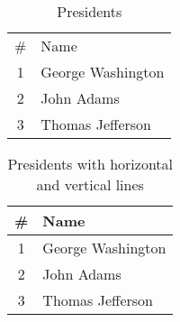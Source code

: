 
\begin{table}
    \caption{Presidents}
    \begin{center}
        \begin{tabular}{cl}
            \#& Name\\
            1&  George Washington\\
            2&  John Adams\\
            3&  Thomas Jefferson\\
        \end{tabular}
    \end{center}
\end{table}

\begin{table}
    \caption{Presidents with horizontal and vertical lines}
    \begin{center}
        \begin{tabular}{|c|l|}
            \hline
            \#& Name\\
            \hline
            1&  George Washington\\
            \hline
            2&  John Adams\\
            \hline
            3&  Thomas Jefferson\\
            \hline
        \end{tabular}
    \end{center}
\end{table}
